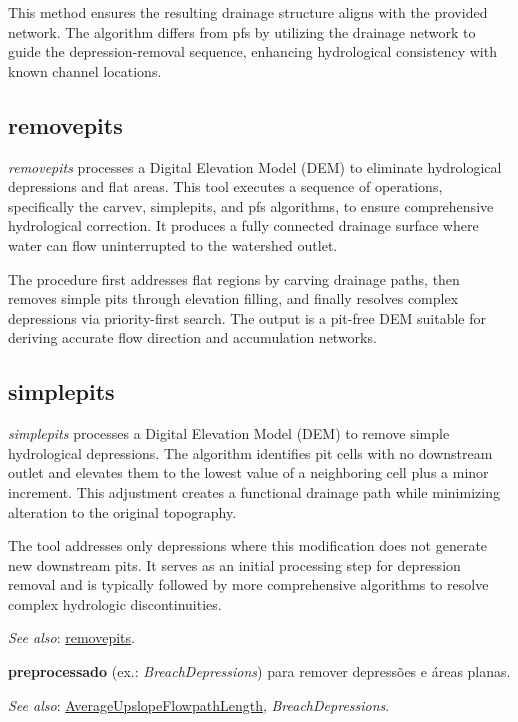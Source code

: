 \documentclass[
]{book}
\theoremstyle{definition}
\theoremstyle{definition}
\theoremstyle{definition}
\theoremstyle{definition}
\theoremstyle{remark}
\begin{document}
This method ensures the resulting drainage structure aligns with the provided network. The algorithm differs from pfs by utilizing the drainage network to guide the depression-removal sequence, enhancing hydrological consistency with known channel locations.

\subsection{removepits}\label{removepits}

\emph{removepits} processes a Digital Elevation Model (DEM) to eliminate hydrological depressions and flat areas. This tool executes a sequence of operations, specifically the carvev, simplepits, and pfs algorithms, to ensure comprehensive hydrological correction. It produces a fully connected drainage surface where water can flow uninterrupted to the watershed outlet.

The procedure first addresses flat regions by carving drainage paths, then removes simple pits through elevation filling, and finally resolves complex depressions via priority-first search. The output is a pit-free DEM suitable for deriving accurate flow direction and accumulation networks.

\subsection{simplepits}\label{simplepits}

\emph{simplepits} processes a Digital Elevation Model (DEM) to remove simple hydrological depressions. The algorithm identifies pit cells with no downstream outlet and elevates them to the lowest value of a neighboring cell plus a minor increment. This adjustment creates a functional drainage path while minimizing alteration to the original topography.

The tool addresses only depressions where this modification does not generate new downstream pits. It serves as an initial processing step for depression removal and is typically followed by more comprehensive algorithms to resolve complex hydrologic discontinuities.

\emph{See also}: \hyperref[removepits]{removepits}.

\textbf{preprocessado} (ex.: \emph{BreachDepressions}) para remover depressões e áreas planas.

\emph{See also}: \hyperref[AverageUpslopeFlowpathLength]{AverageUpslopeFlowpathLength}, \emph{BreachDepressions}.
\end{document}
